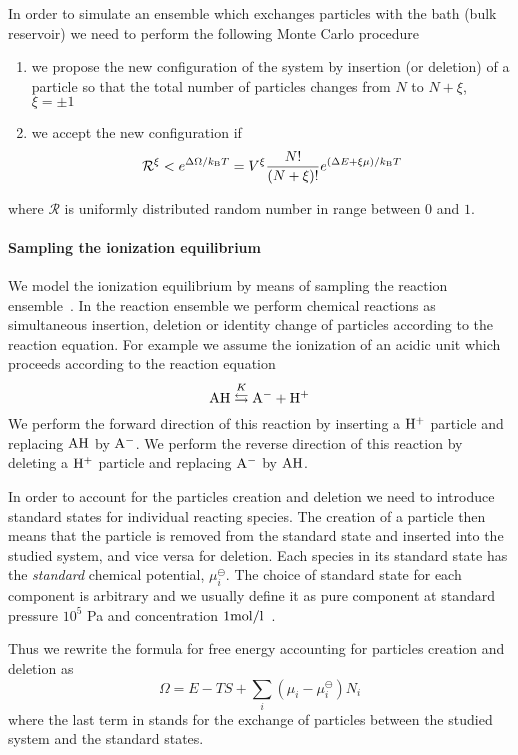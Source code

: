 \documentclass{elsarticle}
\begin{document}
In order to simulate an ensemble which exchanges particles with the bath (bulk reservoir) we need to perform the following Monte Carlo procedure \cite{Frenlkel2002_book}
\begin{enumerate}
	\item we propose the new configuration of the system by insertion (or deletion) of a particle so that the total number of particles changes from $N$ to $N+\xi$, $\xi=\pm1$
	\item we accept the new configuration if
	\begin{equation}
        \mathcal{R}^{\xi}<e^{\Delta\Omega/k_\mathrm{B}T}=V^{\xi}\frac{N!}{(N+\xi)!}e^{\left(\Delta E+\xi\mu\right)/k_\mathrm{B}T}\label{eq: GC acceptance}
	\end{equation}
\end{enumerate}
where $\mathcal{R}$ is uniformly distributed random number in range between $0$ and $1$.

\paragraph{Sampling the ionization equilibrium}
We model the ionization equilibrium by means of sampling the reaction ensemble~\cite{Smith1994, Turner2008a}.
In the reaction ensemble we perform chemical reactions as simultaneous insertion, deletion or identity change of particles according to the reaction equation.
For example we assume the ionization of an acidic unit which proceeds according to the reaction equation
\begin{equation}
    \mathrm{AH}\stackrel{K}{\leftrightarrows}\mathrm{A^-}+\mathrm{H^+}\label{eq: acid reaction}
\end{equation}
We perform the forward direction of this reaction
by inserting a $\mathrm{H^+}$ particle and replacing $\mathrm{AH}$ by $\mathrm{A^-}$.
We perform the reverse direction of this reaction
by deleting a $\mathrm{H^+}$ particle and replacing $\mathrm{A^-}$ by $\mathrm{AH}$.

In order to account for the particles creation and deletion
we need to introduce standard states for individual reacting species.
The creation of a particle then means that the particle is removed from the standard state
and inserted into the studied system, and vice versa for deletion.
Each species in its standard state has the \emph{standard} chemical potential, $\mu^\ominus_i$.
The choice of standard state for each component is arbitrary
and we usually define it as pure component at standard pressure $10^5$ Pa
and concentration $1 \mathrm{mol/l}$~\cite{IUPAC}.

Thus we rewrite the formula for free energy 
accounting for particles creation and deletion as
\begin{equation}
    \Omega=E-TS+\sum_i\left(\mu_i-\mu^\ominus_i\right) N_i\label{eq:Omega-RE}
\end{equation}
where the last term in  stands for the exchange of particles between the studied system and the standard states.
\end{document}
